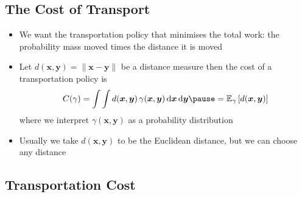 \begin{slide}
\section{The Cost of Transport}

\begin{PauseHighLight}
  \begin{itemize}
  \item We want the transportation policy that minimises the total work:
    the probability mass moved times the distance it is moved\pause
  \item Let $d(\bm{x},\bm{y})=\|\bm{x}-\bm{y}\|$ be a distance measure
    then the cost of a transportation policy is
    \begin{align*}
      C(\gamma) = \int \int d(\bm{x},\bm{y})\,\gamma(\bm{x},\bm{y}) \,
      \dd\bm{x}\,\dd\bm{y}\pause = \av[\gamma]{d(\bm{x},\bm{y})}
    \end{align*}
    where we interpret $\gamma(\bm{x},\bm{y})$ as a probability
    distribution\pauseb
  \item Usually we take $d(\bm{x},\bm{y})$ to be the Euclidean
    distance, but we can choose any distance\pause
  \end{itemize}
\end{PauseHighLight}

\end{slide}


\begin{slide}
\section[-2]{Transportation Cost}

\pb
\pause{}
\begin{center}
  \pause
\end{center}
\end{slide}


